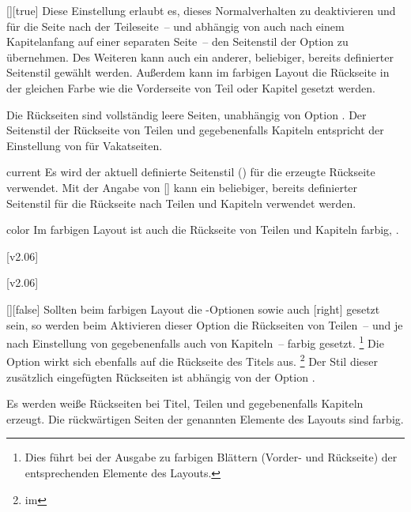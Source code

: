 \begin{Declaration*}{}
\begin{Declaration*}{}
\begin{Declaration*}{}
\begin{Declaration}{[\PSet]}[true]
Diese Einstellung erlaubt es, dieses Normalverhalten zu deaktivieren und für 
die Seite nach der Teileseite~-- und abhängig von  
auch nach einem Kapitelanfang auf einer separaten Seite~-- den Seitenstil der 
Option  zu übernehmen. Des Weiteren kann auch ein 
anderer, beliebiger, bereits definierter Seitenstil gewählt werden. Außerdem
kann im farbigen Layout die Rückseite in der gleichen Farbe wie die 
Vorderseite von Teil oder Kapitel gesetzt werden. \notudscrartcl
%
\begin{values}
\itemfalse
  Die Rückseiten sind vollständig leere Seiten, unabhängig von Option
  .
\itemtrue*
  Der Seitenstil der Rückseite von Teilen und gegebenenfalls Kapiteln 
  entspricht der Einstellung von  für Vakatseiten.
\item[current]
  Es wird der aktuell definierte Seitenstil () für die 
  erzeugte Rückseite verwendet.
  Mit der Angabe von [] 
  kann ein beliebiger, bereits definierter Seitenstil für die Rückseite nach 
  Teilen und Kapiteln verwendet werden.
\item[color]
  Im farbigen Layout ist auch die Rückseite von Teilen und Kapiteln farbig, 
  .
\end{values}
[v2.06]
\end{Declaration}

[v2.06]
\begin{Declaration}{[\PBoolean]}[false]%
\printdeclarationlist%
%
%
%
%
%
Sollten beim farbigen Layout die \KOMAScript-Optionen  sowie 
auch [right] gesetzt sein, so werden beim Aktivieren dieser Option 
die Rückseiten von Teilen~-- und je nach Einstellung von  
gegebenenfalls auch von Kapiteln~-- farbig gesetzt.%
\footnote{%
  Dies führt bei der Ausgabe zu farbigen Blättern (Vorder- und Rückseite) der 
  entsprechenden Elemente des Layouts.
}
Die Option wirkt sich ebenfalls auf die Rückseite des Titels aus.%
\footnote{%
   im \scrguide*
}
Der Stil dieser zusätzlich eingefügten Rückseiten ist abhängig von der Option
.
%
\begin{values}
\itemfalse
  Es werden weiße Rückseiten bei Titel, Teilen und gegebenenfalls Kapiteln 
  erzeugt.
\itemtrue*
  Die rückwärtigen Seiten der genannten Elemente des Layouts sind farbig.
\end{values}
\end{Declaration}
%




\end{Declaration*}
\end{Declaration*}
\end{Declaration*}
